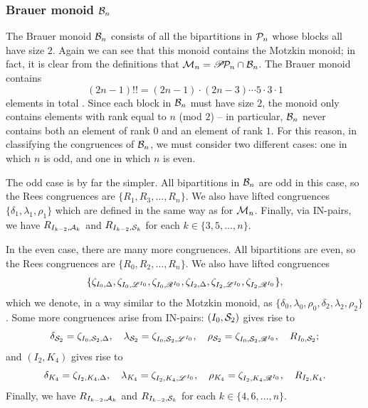 \subsubsection{Brauer monoid $\mathcal{B}_n$}
The Brauer monoid $\mathcal{B}_n$ consists of all the bipartitions in $\mathcal{P}_n$ whose
blocks all have size $2$.  Again we can see that this monoid contains the
Motzkin monoid; in fact, it is clear from the definitions that
$\mathcal{M}_n = \mathscr{P}\!\mathcal{P}_n \cap \mathcal{B}_n$.
The Brauer monoid contains
$$(2n-1)!! = (2n-1) \cdot (2n-3)\cdots 5 \cdot 3 \cdot 1$$
elements in total .
Since each block in $\mathcal{B}_n$ must have
size $2$, the monoid only contains elements with rank equal to $n$ (mod
$2$) -- in particular, $\mathcal{B}_n$ never contains both an element of rank $0$ and
an element of rank $1$.  For this reason, in classifying the congruences of
$\mathcal{B}_n$, we must consider two different cases: one in which $n$ is odd, and
one in which $n$ is even.

The odd case is by far the simpler.  All bipartitions in $\mathcal{B}_n$ are odd in
this case, so the Rees congruences are $\{R_1, R_3, \ldots, R_n\}$.  We also
have lifted congruences $\{\delta_1, \lambda_1, \rho_1\}$ which are defined in
the same way as for $\mathcal{M}_n$.  Finally, via IN-pairs, we have
$R_{I_{k-2}, \mathcal{A}_k}$ and $R_{I_{k-2}, \mathcal{S}_k}$ for each
$k \in \{3, 5, \ldots, n\}$.

In the even case, there are many more congruences.  All bipartitions are even,
so the Rees congruences are $\{R_0, R_2, \ldots, R_n\}$.  We also have lifted
congruences
$$\{\zeta_{I_0,\Delta}, \zeta_{I_0,\mathscr{L}^{I_0}}, \zeta_{I_0,\mathscr{R}^{I_0}},
\zeta_{I_2,\Delta}, \zeta_{I_2,\mathscr{L}^{I_0}}, \zeta_{I_2,\mathscr{R}^{I_0}}\},$$ which we
denote, in a way similar to the Motzkin monoid, as
$\{\delta_0, \lambda_0, \rho_0, \delta_2, \lambda_2, \rho_2\}$.
Some more congruences arise from IN-pairs: $(I_0, \mathcal{S}_2)$ gives rise
to $$\delta_{\mathcal{S}_2} = \zeta_{I_0,\mathcal{S}_2,\Delta},\quad
\lambda_{\mathcal{S}_2} = \zeta_{I_0,\mathcal{S}_2,\mathscr{L}^{I_0}},\quad
\rho_{\mathcal{S}_2} = \zeta_{I_0,\mathcal{S}_2,\mathscr{R}^{I_0}},\quad
R_{I_0,\mathcal{S}_2};$$
and $(I_2, K_4)$ gives rise to
$$\delta_{K_4} = \zeta_{I_2,K_4,\Delta},\quad
\lambda_{K_4} = \zeta_{I_2,K_4,\mathscr{L}^{I_0}},\quad
\rho_{K_4} = \zeta_{I_2,K_4,\mathscr{R}^{I_0}},\quad
R_{I_2,K_4}.$$
Finally, we have $R_{I_{k-2},\mathcal{A}_k}$ and $R_{I_{k-2},\mathcal{S}_k}$ for each $k \in
\{4, 6, \ldots, n\}$.

